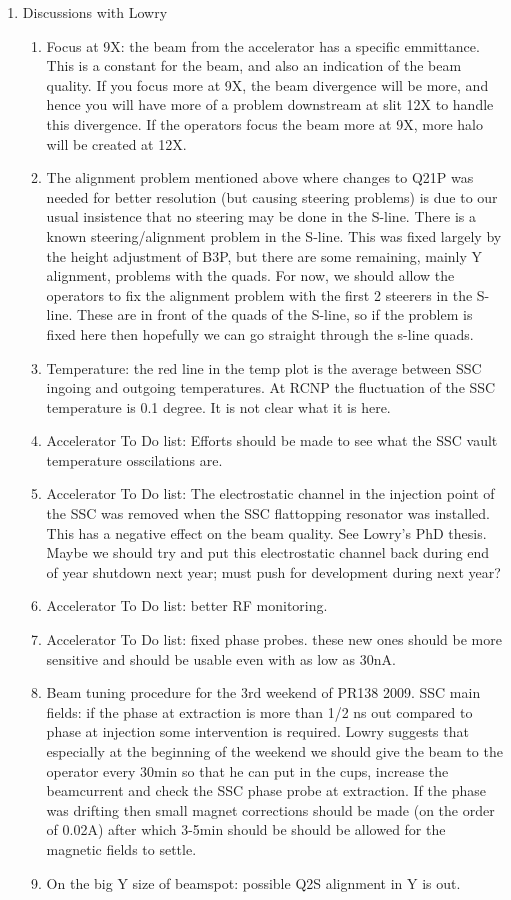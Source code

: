 \documentclass[11pt]{report}
\begin{document}
\begin{enumerate}
\item Discussions with Lowry
  \begin{enumerate}
  \item Focus at 9X: the beam from the accelerator has a specific emmittance.
        This is a constant for the beam, and also an indication of the beam quality.
	If you focus more at 9X, the beam divergence will be more, and hence you will have
	more of a problem downstream at slit 12X to handle this divergence.
	If the operators focus the beam more at 9X, more halo will be created at 12X.
  \item The alignment problem mentioned above where changes to Q21P was needed for better
        resolution (but causing steering problems) is due to our usual insistence that
	no steering may be done in the S-line. There is a known steering/alignment problem
	in the S-line. This was fixed largely by the height adjustment of B3P, but
	there are some remaining, mainly Y alignment, problems with the quads.
	For now, we should allow the operators to fix the alignment problem
	with the first 2 steerers in the S-line. 
	These are in front of the quads of the S-line, so if the problem 
	is fixed here then hopefully we can go straight through the s-line quads.
  \item Temperature: the red line in the temp plot is the average between SSC ingoing
        and outgoing temperatures.
	At RCNP the fluctuation of the SSC temperature is 0.1 degree. It is not clear what it is here.
  \item Accelerator To Do list: Efforts should be made to see what the SSC vault temperature osscilations are.
  \item Accelerator To Do list: The electrostatic channel in the injection point of the SSC was removed
        when the SSC flattopping resonator was installed.
	This has a negative effect on the beam quality. See Lowry's PhD thesis.
	Maybe we should try and put this electrostatic channel back during
	end of year shutdown next year; must push for development during next year?
  \item Accelerator To Do list: better RF monitoring.
  \item Accelerator To Do list: fixed phase probes. these new ones should be more sensitive and
        should be usable even with as low as 30nA.
  \item Beam tuning procedure for the 3rd weekend of PR138 2009.
        SSC main fields:
	if the phase at extraction is more than 1/2 ns out compared to phase at injection
	some intervention is required.
	Lowry suggests that especially at the beginning of the weekend we should give the beam
	to the operator every 30min so that he can put in the cups, increase the beamcurrent
	and check the SSC phase probe at extraction. If the phase was drifting then small
	magnet corrections should be made (on the order of 0.02A) after which 3-5min should be
	should be allowed for the magnetic fields to settle.
  \item On the big Y size of beamspot: possible Q2S alignment in Y is out.
  \end{enumerate}   


\end{enumerate}
\end{document}
